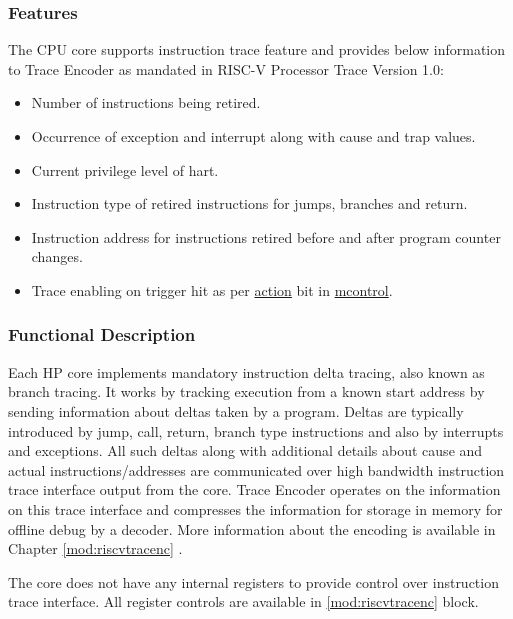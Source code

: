 \documentclass[main\_\_EN.tex]{subfiles}
\begin{document}
\subsubsection{Features}
\label{sec:riscvcpu-trace-features}

The CPU core supports instruction trace feature and provides below information to Trace Encoder as mandated in RISC-V Processor Trace Version 1.0:

\begin{itemize}
    \item Number of instructions being retired.
    \item Occurrence of exception and interrupt along with cause and trap values.
    \item Current privilege level of hart.
    \item Instruction type of retired instructions for jumps, branches and return.
    \item Instruction address for instructions retired before and after program counter changes.
    \item Trace enabling on trigger hit as per \hyperref[regdesc:MCONTROL]{action} bit in \hyperref[regdesc:MCONTROL]{mcontrol}.
\end{itemize}


\subsubsection{Functional Description}
\label{sec:riscvcpu-trace-func-descr}

Each HP core implements mandatory instruction delta tracing, also known as branch tracing. It works by tracking execution from a known start address by sending information about deltas taken by a program. Deltas are typically introduced by jump, call, return, branch type instructions and also by interrupts and exceptions. All such deltas along with additional details about cause and actual instructions/addresses are communicated over high bandwidth instruction trace interface output from the core. Trace Encoder operates on the information on this trace interface and compresses the information for storage in memory for offline debug by a decoder. More information about the encoding is available in Chapter \ref{mod:riscvtracenc} \textit{}.

The core does not have any internal registers to provide control over instruction trace interface. All register controls are available in \ref{mod:riscvtracenc} \textit{} block.
\end{document}

